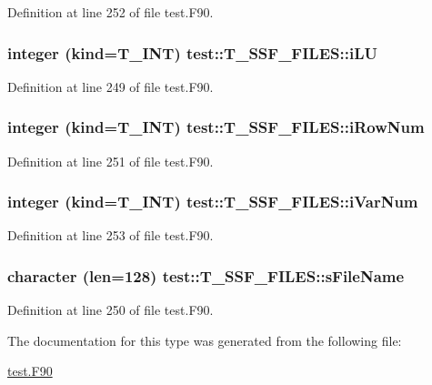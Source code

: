 Definition at line 252 of file test.F90.

\hypertarget{typetest_1_1_t___s_s_f___f_i_l_e_s_a75a178baf9a6812ad40701afe5c5d4ab}{
\subsubsection[{iLU}]{\setlength{\rightskip}{0pt plus 5cm}integer (kind={\bf T\_\-INT}) {\bf test::T\_\-SSF\_\-FILES::iLU}}}
\label{typetest_1_1_t___s_s_f___f_i_l_e_s_a75a178baf9a6812ad40701afe5c5d4ab}


Definition at line 249 of file test.F90.

\hypertarget{typetest_1_1_t___s_s_f___f_i_l_e_s_a401d7ac28f70b2b2058955f54ad4a7f3}{
\subsubsection[{iRowNum}]{\setlength{\rightskip}{0pt plus 5cm}integer (kind={\bf T\_\-INT}) {\bf test::T\_\-SSF\_\-FILES::iRowNum}}}
\label{typetest_1_1_t___s_s_f___f_i_l_e_s_a401d7ac28f70b2b2058955f54ad4a7f3}


Definition at line 251 of file test.F90.

\hypertarget{typetest_1_1_t___s_s_f___f_i_l_e_s_a53f02875290d171412f878a6d22527a9}{
\subsubsection[{iVarNum}]{\setlength{\rightskip}{0pt plus 5cm}integer (kind={\bf T\_\-INT}) {\bf test::T\_\-SSF\_\-FILES::iVarNum}}}
\label{typetest_1_1_t___s_s_f___f_i_l_e_s_a53f02875290d171412f878a6d22527a9}


Definition at line 253 of file test.F90.

\hypertarget{typetest_1_1_t___s_s_f___f_i_l_e_s_ae3d105aa00d96de173e6e555b450915a}{
\subsubsection[{sFileName}]{\setlength{\rightskip}{0pt plus 5cm}character (len=128) {\bf test::T\_\-SSF\_\-FILES::sFileName}}}
\label{typetest_1_1_t___s_s_f___f_i_l_e_s_ae3d105aa00d96de173e6e555b450915a}


Definition at line 250 of file test.F90.



The documentation for this type was generated from the following file:\begin{DoxyCompactItemize}
\item 
\hyperlink{test_8_f90}{test.F90}\end{DoxyCompactItemize}
